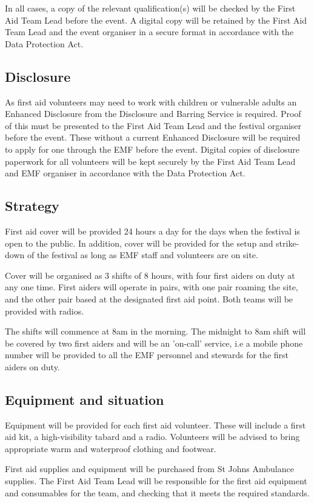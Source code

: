 In all cases, a copy of the relevant qualification(s) will be checked by the
First Aid Team Lead before the event. A digital copy will be retained by the
First Aid Team Lead and the event organiser in a secure format in accordance
with the Data Protection Act.

\subsection{Disclosure}
As first aid volunteers may need to work with children or vulnerable adults an
Enhanced Disclosure from the Disclosure and Barring Service is required. Proof
of this must be presented to the First Aid Team Lead and the festival organiser
before the event. These without a current Enhanced Disclosure will be required
to apply for one through the EMF  before the event. Digital copies of disclosure
paperwork for all volunteers will be kept securely by the First Aid Team Lead and
EMF organiser in accordance with the Data Protection Act.

\subsection{Strategy}
First aid cover will be provided 24 hours a day for the days when the festival
is open to the public. In addition, cover will be provided for the setup and
strike-down of the festival as long as EMF staff and volunteers are on site.

Cover will be organised as 3 shifts of 8 hours, with four first aiders on duty
at any one time. First aiders will operate in pairs, with one pair roaming the
site, and the other pair based at the designated first aid point. Both teams
will be provided with radios.

The shifts will commence at 8am in the morning. The midnight to 8am shift will
be covered by two first aiders and will be an 'on-call’ service, i.e a mobile
phone number will be provided to all the EMF personnel and stewards for the
first aiders on duty.

\subsection{Equipment and situation}
Equipment will be provided for each first aid volunteer. These will include a
first aid kit, a high-visibility tabard and a radio. Volunteers will be advised
to bring appropriate warm and waterproof clothing and footwear.

First aid supplies and equipment will be purchased from St Johns Ambulance
supplies. The First Aid Team Lead will be responsible for the first aid
equipment and consumables for the team, and checking that it meets the required
standards.

